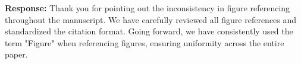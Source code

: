 \documentclass[a4paper,twoside,11pt,dvipsnames]{reviewresponse}
\begin{document}
\textbf{Response:} 
Thank you for pointing out the inconsistency in figure referencing throughout the manuscript. We have carefully reviewed all figure references and standardized the citation format. Going forward, we have consistently used the term "Figure" when referencing figures, ensuring uniformity across the entire paper.

\end{document}

